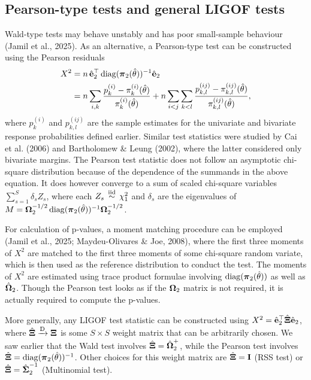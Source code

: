 \documentclass[
  letterpaper,
  DIV=11,
  numbers=noendperiod]{scrartcl}
\begin{document}
\subsection{Pearson-type tests and general LIGOF
tests}\label{pearson-type-tests-and-general-ligof-tests}

Wald-type tests may behave unstably and has poor small-sample behaviour
(Jamil et al., 2025). As an alternative, a Pearson-type test can be
constructed using the Pearson residuals \[
\begin{aligned}
X^2 
&= n \, \hat{{\mathbf e}}_2^\top \operatorname{diag}({\boldsymbol\pi}_2(\hat\theta))^{-1} \hat{{\mathbf e}}_2 \\
&= 
n \sum_{i,k} \frac{p_k^{(i)} - \pi_k^{(i)}(\hat\theta)}{\pi_k^{(i)}(\hat\theta)} +
n \sum_{i<j}\sum_{k<l} \frac{p_{k,l}^{(ij)} - \pi_{k,l}^{(ij)}(\hat\theta)}{\pi_{k,l}^{(ij)}(\hat\theta)},
\end{aligned}
\] where \(p_k^{(i)}\) and \(p_{k,l}^{(ij)}\) are the sample estimates
for the univariate and bivariate response probabilities defined earlier.
Similar test statistics were studied by Cai et al. (2006) and
Bartholomew \& Leung (2002), where the latter considered only bivariate
margins. The Pearson test statistic does not follow an asymptotic
chi-square distribution because of the dependence of the summands in the
above equation. It does however converge to a sum of scaled chi-square
variables \(\sum_{s=1}^S \delta_s Z_s\), where each
\(Z_s \,\overset{\text{iid}}{\sim}\, \chi^2_1\) and \(\delta_s\) are the eigenvalues of
\(M={\boldsymbol\Omega}_2^{-1/2} \operatorname{diag}({\boldsymbol\pi}_2(\hat\theta))^{-1} {\boldsymbol\Omega}_2^{-1/2}\).

For calculation of p-values, a moment matching procedure can be employed
(Jamil et al., 2025; Maydeu-Olivares \& Joe, 2008), where the first
three moments of \(X^2\) are matched to the first three moments of some
chi-square random variate, which is then used as the reference
distribution to conduct the test. The moments of \(X^2\) are estimated
using trace product formulae involving \(\operatorname{diag}({\boldsymbol\pi}_2(\hat\theta))\) as
well as \(\hat{{\boldsymbol\Omega}}_2\). Though the Pearson test looks as if the
\({\boldsymbol\Omega}_2\) matrix is not required, it is actually required to compute
the p-values.

More generally, any LIGOF test statistic can be constructed using
\(X^2 = \hat{{\mathbf e}}_2^\top \hat{{\boldsymbol\Xi}} \hat{{\mathbf e}}_2\), where
\(\hat{{\boldsymbol\Xi}} \xrightarrow{\text D} {\boldsymbol\Xi}\) is some \(S\times S\) weight
matrix that can be arbitrarily chosen. We saw earlier that the Wald test
involves \(\hat{{\boldsymbol\Xi}}=\hat{{\boldsymbol\Omega}}_2^{+}\), while the Pearson test involves
\(\hat{{\boldsymbol\Xi}} = \operatorname{diag}({\boldsymbol\pi}_2(\hat\theta))^{-1}\). Other choices for this
weight matrix are \(\hat{{\boldsymbol\Xi}} = {\mathbf I}\) (RSS test) or
\(\hat{{\boldsymbol\Xi}} = \hat{{\boldsymbol\Sigma}}_2^{-1}\) (Multinomial test).
\end{document}
